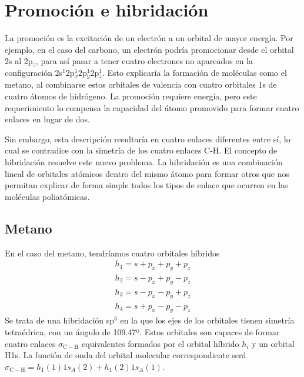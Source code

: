\section{Promoción e hibridación}
La promoción es la excitación de un electrón 
a un orbital de mayor energía. Por ejemplo, en
el caso del carbono, un electrón podría promocionar
desde el orbital 2s al 2p$_z$, para así pasar a tener
cuatro electrones no apareados en la configuración
2s$^1$2p$_x^1$2p$_y^1$2p$_z^1$. Esto explicaría la
formación de moléculas como el metano, al combinarse
estos orbitales de valencia con cuatro orbitales 1s 
de cuatro átomos de hidrógeno. La promoción requiere
energía, pero este requerimiento lo compensa la
capacidad del átomo promovido para formar 
cuatro enlaces en lugar de dos.

Sin embargo, esta descripción resultaría en cuatro 
enlaces diferentes entre sí, lo cual se contradice
con la simetría de los cuatro enlaces C-H. El 
concepto de hibridación resuelve este nuevo problema.
La hibridación es una combinación lineal de orbitales
atómicos dentro del mismo átomo para formar otros que 
nos permitan explicar de forma simple todos los tipos 
de enlace que ocurren en las moléculas poliatómicas.

\subsection{Metano}
En el caso del metano, tendríamos cuatro orbitales 
híbridos
\begin{align*}
    h_1=s+p_x+p_y+p_z\\
    h_2=s-p_x+p_y-p_z\\
    h_3=s-p_x-p_y+p_z\\
    h_4=s+p_x-p_y-p_z
\end{align*}
Se trata de una hibridación sp$^3$ en la que los ejes 
de los orbitales tienen simetría tetraédrica, con
un ángulo de 109.47º. Estos orbitales son capaces de
formar cuatro enlaces $\sigma_\mathrm{C-H}$ equivalentes
formados por el orbital híbrido $h_i$ y un orbital 
H1s. La función de onda del orbital molecular correspondiente
será $\sigma_\mathrm{C-H}= h_1(1)1s_{A}(2)+h_1(2)1s_{A}(1)$.

